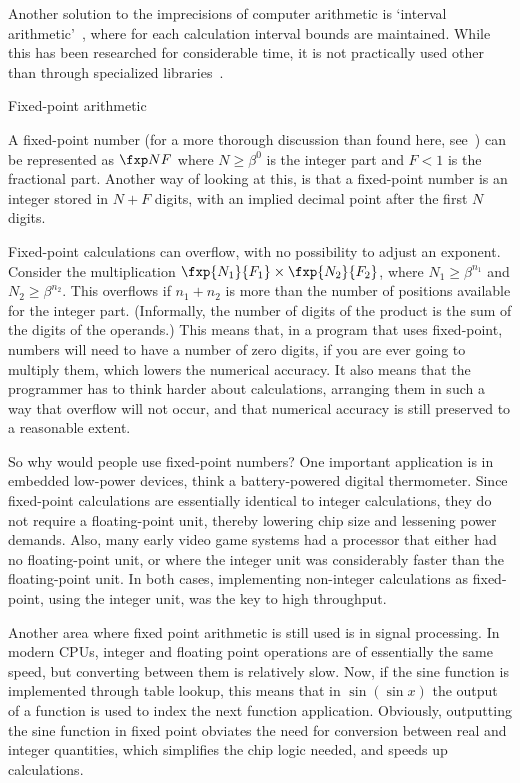Another solution to the imprecisions of computer arithmetic is `interval
arithmetic'~\cite{wikipedia:interval-arithmetic}, where for each
calculation interval bounds are maintained. While this has been
researched for considerable time, it is not practically used other
than through specialized libraries~\cite{boost:interval-arithmetic}.

 {Fixed-point arithmetic}

A fixed-point number (for a more thorough discussion than found here,
see~\cite{YatesFixedPoint}) can be represented as $\fxp NF$ where
$N\geq\beta^0$ is the integer part and $F<1$ is the fractional
part. Another way of looking at this, is that a fixed-point number is
an integer stored in $N+F$ digits, with an implied decimal point after
the first $N$ digits.

Fixed-point calculations can overflow, with no possibility to adjust
an exponent. Consider the multiplication $\fxp{N_1}{F_1}\times
\fxp{N_2}{F_2}$, where $N_1\geq \beta^{n_1}$ and $N_2\geq
\beta^{n_2}$. This overflows if $n_1+n_2$ is more than the number of
positions available for the integer part. (Informally, the number of
digits of the product is the sum of the digits of the operands.)
This means that, in a program
that uses fixed-point, numbers will need to have a number of zero
digits, if you are ever going to multiply them, 
which lowers the numerical accuracy.
It also means that the programmer has to think harder about
calculations, arranging them in such a way that overflow will not
occur, and that numerical accuracy is still preserved to a reasonable
extent.

So why would people use fixed-point numbers? One important application
is in embedded low-power devices, think a battery-powered digital
thermometer. Since fixed-point calculations are essentially identical
to integer calculations, they do not require a floating-point unit,
thereby lowering chip size and lessening power demands. Also, many
early video game systems had a processor that either had no
floating-point unit, or where the integer unit was considerably faster
than the floating-point unit. In both cases, implementing non-integer
calculations as fixed-point, using the integer unit, was the key to
high throughput. 

Another area where fixed point arithmetic is still used is in signal
processing. In modern CPUs, integer and floating point operations
are of essentially the same speed, but converting between them is
relatively slow. Now, if the sine function is implemented through
table lookup, this means that in $\sin(\sin x)$ 
the output of a function is used to index the next function
application. Obviously, outputting the sine function in fixed point
obviates the need for conversion between real and integer quantities,
which simplifies the chip logic needed, and speeds up calculations.

